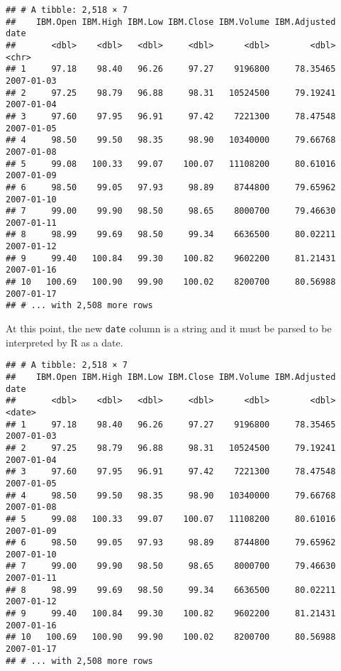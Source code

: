\documentclass[]{book}
\newenvironment{Shaded}{\begin{snugshade}}{\end{snugshade}}
\newcommand{\KeywordTok}[1]{\textcolor[rgb]{0.13,0.29,0.53}{\textbf{{#1}}}}
\newcommand{\DataTypeTok}[1]{\textcolor[rgb]{0.13,0.29,0.53}{{#1}}}
\newcommand{\StringTok}[1]{\textcolor[rgb]{0.31,0.60,0.02}{{#1}}}
\newcommand{\NormalTok}[1]{{#1}}
\begin{document}
\begin{verbatim}
## # A tibble: 2,518 × 7
##    IBM.Open IBM.High IBM.Low IBM.Close IBM.Volume IBM.Adjusted       date
##       <dbl>    <dbl>   <dbl>     <dbl>      <dbl>        <dbl>      <chr>
## 1     97.18    98.40   96.26     97.27    9196800     78.35465 2007-01-03
## 2     97.25    98.79   96.88     98.31   10524500     79.19241 2007-01-04
## 3     97.60    97.95   96.91     97.42    7221300     78.47548 2007-01-05
## 4     98.50    99.50   98.35     98.90   10340000     79.66768 2007-01-08
## 5     99.08   100.33   99.07    100.07   11108200     80.61016 2007-01-09
## 6     98.50    99.05   97.93     98.89    8744800     79.65962 2007-01-10
## 7     99.00    99.90   98.50     98.65    8000700     79.46630 2007-01-11
## 8     98.99    99.69   98.50     99.34    6636500     80.02211 2007-01-12
## 9     99.40   100.84   99.30    100.82    9602200     81.21431 2007-01-16
## 10   100.69   100.90   99.90    100.02    8200700     80.56988 2007-01-17
## # ... with 2,508 more rows
\end{verbatim}

At this point, the new \texttt{date} column is a string and it must be
parsed to be interpreted by R as a date.

\begin{Shaded}
\end{Shaded}

\begin{verbatim}
## # A tibble: 2,518 × 7
##    IBM.Open IBM.High IBM.Low IBM.Close IBM.Volume IBM.Adjusted       date
##       <dbl>    <dbl>   <dbl>     <dbl>      <dbl>        <dbl>     <date>
## 1     97.18    98.40   96.26     97.27    9196800     78.35465 2007-01-03
## 2     97.25    98.79   96.88     98.31   10524500     79.19241 2007-01-04
## 3     97.60    97.95   96.91     97.42    7221300     78.47548 2007-01-05
## 4     98.50    99.50   98.35     98.90   10340000     79.66768 2007-01-08
## 5     99.08   100.33   99.07    100.07   11108200     80.61016 2007-01-09
## 6     98.50    99.05   97.93     98.89    8744800     79.65962 2007-01-10
## 7     99.00    99.90   98.50     98.65    8000700     79.46630 2007-01-11
## 8     98.99    99.69   98.50     99.34    6636500     80.02211 2007-01-12
## 9     99.40   100.84   99.30    100.82    9602200     81.21431 2007-01-16
## 10   100.69   100.90   99.90    100.02    8200700     80.56988 2007-01-17
## # ... with 2,508 more rows
\end{verbatim}
\end{document}
